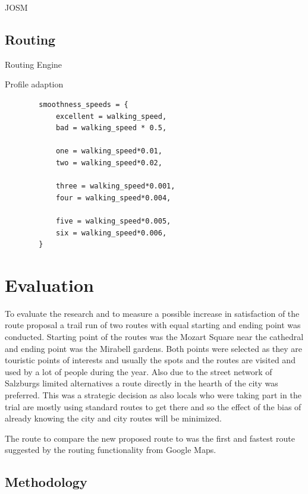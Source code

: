 JOSM




\subsection{Routing}

Routing Engine

Profile adaption

\begin{lstlisting}
        smoothness_speeds = {
            excellent = walking_speed,
            bad = walking_speed * 0.5,

            one = walking_speed*0.01,
            two = walking_speed*0.02,

            three = walking_speed*0.001,
            four = walking_speed*0.004,
            
            five = walking_speed*0.005,
            six = walking_speed*0.006,
        }
\end{lstlisting}

\autocite[]{Delling2012}


\section{Evaluation}

To evaluate the research and to measure a possible increase in satisfaction of the route proposal a trail run of two routes with equal starting and ending point was conducted. Starting point of the routes was the Mozart Square near the cathedral and ending point was the Mirabell gardens. Both points were selected as they are touristic points of interests and usually the spots and the routes are visited and used by a lot of people during the year. Also due to the street network of Salzburgs limited alternatives a route directly in the hearth of the city was preferred. This was a strategic decision as also locals who were taking part in the trial are mostly using standard routes to get there and so the effect of the bias of already knowing the city and city routes will be minimized.

The route to compare the new proposed route to was the first and fastest route suggested by the routing functionality from Google Maps. 

\subsection{Methodology}


